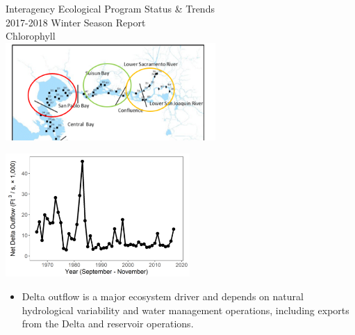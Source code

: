 \documentclass[]{article}\usepackage[]{graphicx}\usepackage[]{color}
\begin{document}
\newpage


\begin{Row}
  \begin{Cell}{7}
    \vspace{0.2cm}
    \begin{center}
      \doublespacing
      {\Large Interagency Ecological Program Status \& Trends } \\
      \vspace{0.2cm}
      {\Large 2017-2018 Winter Season Report} \\
      \vspace{0.5cm}
      {\Huge Chlorophyll} \\
      \vspace{0.75cm}
      \includegraphics[width=8cm,align=m]{figures/region_map.png}
    \end{center}
  \end{Cell}
  \begin{Cell}{6}
    \vspace{0.2cm}
    \begin{center}
      \includegraphics[width=7cm,trim=0 0 0 0,clip,align=m]{figures/outflow_tmp.png}
      \begin{itemize}[leftmargin=*]
        \item Delta outflow is a major ecosystem driver and depends on natural 
        hydrological variability and water management operations, including exports 
        from the Delta and reservoir operations. 
      \end{itemize}
    \end{center}
  \end{Cell}
\end{Row}
\end{document}
